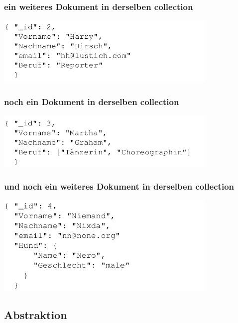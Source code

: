       \begin{frame}
        \frametitle{ein weiteres Dokument in derselben collection}
        \begin{center}
        \includegraphics[width=0.8\textwidth]{pics/doc2}
        \end{center}
      \end{frame}
      
      \begin{frame}
        \frametitle{noch ein Dokument in derselben collection}
        \begin{center}
        \includegraphics[width=0.8\textwidth]{pics/doc3}
        \end{center}
      \end{frame}

      \begin{frame}
        \frametitle{und noch ein weiteres Dokument in derselben collection}
        \begin{center}
        \includegraphics[width=0.8\textwidth]{pics/doc4}
        \end{center}
      \end{frame}

    \subsection{Abstraktion}


